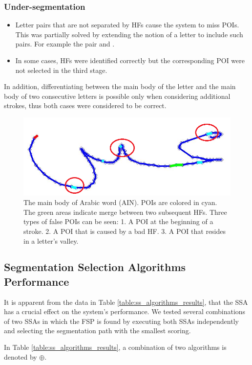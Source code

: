 \documentclass[10pt, conference, compsocconf]{IEEEtran}
\begin{document}
\subsubsection{Under-segmentation}
\begin{itemize}
\item Letter pairs that are not separated by HFs cause the system to miss POIs. This was partially solved by extending the notion of a letter to include such pairs. For example the pair  and .
\item In some cases, HFs were identified correctly but the corresponding POI were not selected in the third stage. 
\end{itemize}

In addition, differentiating between the main body of the letter  and the main body of two consecutive  letters is possible only when considering additional strokes, thus both cases were considered to be correct.

\begin{figure}
\centering
\includegraphics[width=0.5\columnwidth]{./figures/candidate_in_no_horizontal}
\caption{The main body of Arabic word  (AIN). POIs are colored in cyan. The green areas indicate merge between two subsequent HFs. Three types of false POIs can be seen: 1. A POI at the beginning of a stroke. 2. A POI that is caused by a bad HF. 3. A POI that resides in a letter's valley. }
\label{fig:candidate_in_no_horizontal}
\end{figure}

\subsection{Segmentation Selection Algorithms Performance}
\label{subsec:ssa_performance}
It is apparent from the data in Table \ref{table:ss_algorithms_results}, that the SSA has a crucial effect on the system's performance. 
We tested several combinations of two SSAs in which the FSP is found by executing both SSAs independently and selecting the segmentation path with the smallest scoring. 

In Table \ref{table:ss_algorithms_results}, a combination of two algorithms is denoted by $\oplus$.
\end{document}
